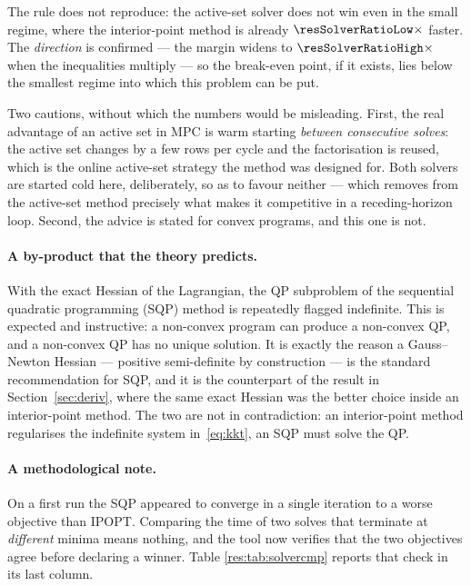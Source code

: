 \documentclass[11pt,a4paper]{article}
\begin{document}

The rule does not reproduce: the active-set solver does not win even in the small regime, where the
interior-point method is already $\resSolverRatioLow\times$ faster. The \emph{direction} is confirmed --- the
margin widens to $\resSolverRatioHigh\times$ when the inequalities multiply --- so the break-even point, if
it exists, lies below the smallest regime into which this problem can be put.

Two cautions, without which the numbers would be misleading. First, the real advantage of an active set in
MPC is warm starting \emph{between consecutive solves}: the active set changes by a few rows per cycle and
the factorisation is reused, which is the online active-set strategy the method was designed for. Both
solvers are started cold here, deliberately, so as to favour neither --- which removes from the active-set
method precisely what makes it competitive in a receding-horizon loop. Second, the advice is stated for
convex programs, and this one is not.

\paragraph{A by-product that the theory predicts.} With the exact Hessian of the Lagrangian, the QP subproblem of the sequential quadratic
programming (SQP) method is repeatedly flagged indefinite. This is expected and instructive: a non-convex
program can produce a non-convex QP, and a non-convex QP has no unique solution. It is exactly the reason a
Gauss--Newton Hessian --- positive semi-definite by construction --- is the standard recommendation for SQP,
and it is the counterpart of the result in Section~\ref{sec:deriv}, where the same exact Hessian was the
better choice inside an interior-point method. The two are not in contradiction: an interior-point method
regularises the indefinite system in~\eqref{eq:kkt}, an SQP must solve the QP.

\paragraph{A methodological note.} On a first run the SQP appeared to converge in a single iteration to a
worse objective than IPOPT. Comparing the time of two solves that terminate at \emph{different} minima means
nothing, and the tool now verifies that the two objectives agree before declaring a winner. Table
\ref{res:tab:solvercmp} reports that check in its last column.
\end{document}
